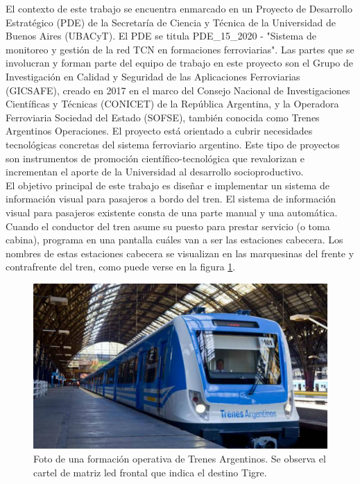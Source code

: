 El  contexto de este trabajo se encuentra enmarcado en un Proyecto de Desarrollo Estratégico (PDE) de la Secretaría de Ciencia y Técnica de la Universidad de Buenos Aires (UBACyT). El PDE se titula PDE\_15\_2020 - "Sistema de monitoreo y gestión de la red TCN en formaciones ferroviarias". Las partes que se involucran y forman parte del equipo de trabajo en este proyecto son el Grupo de Investigación en Calidad y Seguridad de las Aplicaciones Ferroviarias (GICSAFE), creado en 2017 en el marco del Consejo Nacional de Investigaciones Científicas y Técnicas (CONICET) de la República Argentina, y la  Operadora Ferroviaria Sociedad del Estado (SOFSE), también conocida como Trenes Argentinos Operaciones. El proyecto está orientado a cubrir necesidades tecnológicas concretas del sistema ferroviario argentino. Este tipo de proyectos son instrumentos de promoción científico-tecnológica que revalorizan e incrementan el aporte de la Universidad al desarrollo socioproductivo.\\

El objetivo principal de este trabajo es diseñar e implementar un sistema de información visual para pasajeros a bordo del tren. El sistema de información visual para pasajeros existente consta de una parte manual y una automática. Cuando el conductor del tren asume su puesto para prestar servicio (o toma cabina), programa en una pantalla cuáles van a ser las estaciones cabecera. Los nombres de estas estaciones cabecera se visualizan en las marquesinas del frente y contrafrente del tren, como puede verse en la figura \ref{fig:tren}.

\begin{figure}[ht]
	\centering
	\includegraphics[width=1\textwidth]{./Figures/tren.jpg}
	\caption{Foto de una formación operativa de Trenes Argentinos. Se observa el cartel de matriz led frontal que indica el destino Tigre.}
	\label{fig:tren}
\end{figure}


